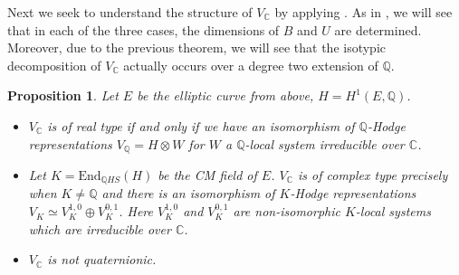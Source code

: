 \documentclass[12pt]{amsart}
\newcommand{\Q}{\mathbb{Q}}
\newcommand{\C}{\mathbb{C}}
\newtheorem{proposition}[theorem]{Proposition}
\theoremstyle{definition}
\theoremstyle{remark}
\numberwithin{equation}{section}
\begin{document}
Next we seek to understand the structure of \(V_\C\) by applying 
. As in , we will see that 
in each of the three cases, the dimensions of \(B\) and \(U\) are determined.
Moreover, due to the previous theorem, we will see that the isotypic decomposition 
of \(V_\C\) actually occurs over a degree two extension of \(\Q\).

\begin{proposition} \label{isotrivial-rep-classification}
    Let \(E\) be the elliptic curve from above, \(H = H^1(E, \Q)\).
    \begin{itemize}
    \item[(a)] \(V_\C\) is of real type if and only if we have an isomorphism
    of \(\Q\)-Hodge representations \(V_\Q = H \otimes W\) for \(W\) a
    \(\Q\)-local system irreducible over \(\C\).
    \item[(b)] Let \(K = \mathrm{End}_{\Q HS}(H)\) be the CM field of \(E\).
    \(V_\C\) is of complex type precisely when \(K \neq \Q\) and there is an 
    isomorphism of \(K\)-Hodge representations  \(V_K \simeq V_K^{1,0} \oplus V_K^{0,1}\).
    Here \(V_K^{1,0}\) and \(V_K^{0,1}\) are non-isomorphic \(K\)-local systems which
    are irreducible over \(\C\).
    \item[(c)] \(V_\C\) is not quaternionic.
    \end{itemize}
\end{proposition}
\end{document}
